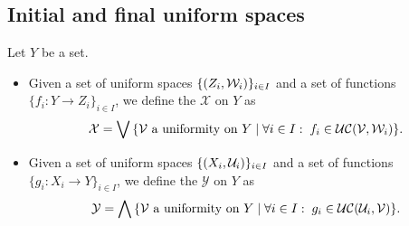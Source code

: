 \subsection{Initial and final uniform spaces}
\begin{definition}
Let $Y$ be a set.
\begin{itemize}
\item Given a set of uniform spaces $\{\sSet{Z_i, \mathcal{W}_i}\}_{i\in I}$ and a set of functions $\{f_i: Y\to Z_i\}_{i\in I}$, we define the  $\mathcal{X}$ on $Y$ as
\[ \mathcal{X} = \bigvee \setbuilder{\text{$\mathcal{V}$ a uniformity on $Y$}}{\forall i\in I:\; f_i\in \ucont(\mathcal{V}, \mathcal{W}_i)}. \]
\item Given a set of uniform spaces $\{\sSet{X_i, \mathcal{U}_i}\}_{i\in I}$ and a set of functions $\{g_i: X_i\to Y\}_{i\in I}$, we define the  $\mathcal{Y}$ on $Y$ as
\[ \mathcal{Y} = \bigwedge \setbuilder{\text{$\mathcal{V}$ a uniformity on $Y$}}{\forall i\in I:\; g_i\in \ucont(\mathcal{U}_i, \mathcal{V})}. \]
\end{itemize}
\end{definition}

